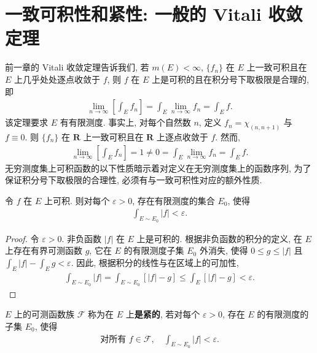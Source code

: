 \documentclass[../../main.tex]{subfiles}
\begin{document}
\section{一致可积性和紧性: 一般的 Vitali 收敛定理}\label{section:ch05-一般Vitali}

前一章的 Vitali 收敛定理告诉我们, 若 $m(E)<\infty$, $\{f_{n}\}$ 在 $E$ 上一致可积且在 $E$ 上几乎处处逐点收敛于 $f$, 则 $f$ 在 $E$ 上是可积的且在积分号下取极限是合理的, 即
\begin{align}
\lim_{n\to\infty}\left[\int_{E}f_{n}\right]=\int_{E}\lim_{n\to\infty}f_{n}=\int_{E}f.\label{align:ch05-有限Vitali}
\end{align}
该定理要求 $E$ 有有限测度. 事实上, 对每个自然数 $n$, 定义 $f_{n}=\chi_{(n,n+1)}$ 与 $f\equiv 0$. 则 $\{f_{n}\}$ 在 $\mathbf{R}$ 上一致可积且在 $\mathbf{R}$ 上逐点收敛于 $f$. 然而,
\begin{align*}
\lim_{n\to\infty}\left[\int_{E}f_{n}\right]=1\neq 0=\int_{E}\lim_{n\to\infty}f_{n}=\int_{E}f.
\end{align*}
无穷测度集上可积函数的以下性质暗示着对定义在无穷测度集上的函数序列, 为了保证积分号下取极限的合理性, 必须有与一致可积性对应的额外性质.

\begin{proposition}\label{proposition:ch05-尾部小}
令 $f$ 在 $E$ 上可积. 则对每个 $\varepsilon>0$, 存在有限测度的集合 $E_{0}$, 使得
\begin{align*}
\int_{E\sim E_{0}}|f|<\varepsilon.
\end{align*}
\end{proposition}

\begin{proof}
令 $\varepsilon>0$. 非负函数 $|f|$ 在 $E$ 上是可积的. 根据非负函数的积分的定义, 在 $E$ 上存在有界可测函数 $g$, 它在 $E$ 的有限测度子集 $E_{0}$ 外消失, 使得 $0\leqslant g\leqslant|f|$ 且 $\int_{E}|f|-\int_{E}g<\varepsilon$. 因此, 根据积分的线性与在区域上的可加性,
\begin{align*}
\int_{E\sim E_{0}}|f|=\int_{E\sim E_{0}}[|f|-g]\leqslant\int_{E}[|f|-g]<\varepsilon.
\end{align*}
\end{proof}

\begin{definition}[紧函数族]\label{definition:ch05-紧}
$E$ 上的可测函数族 $\mathcal{F}$ 称为在 $E$ 上\textbf{是紧的}, 若对每个 $\varepsilon>0$, 存在 $E$ 的有限测度的子集 $E_{0}$, 使得
\begin{align*}
\text{对所有 }f\in\mathcal{F},\quad\int_{E\sim E_{0}}|f|<\varepsilon.
\end{align*}
\end{definition}
\end{document}
